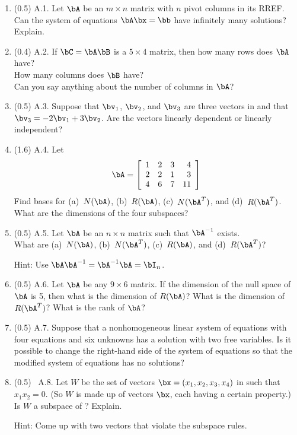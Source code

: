 \documentclass[11pt,titlepage,fleqn]{article}
\begin{document}
\begin{enumerate}
\item (0.5) A.1. Let $\bA$ be an $m \times n$ matrix with $n$ pivot columns in its RREF. \\
Can the system of equations $\bA\bx=\bb$ have infinitely many solutions? Explain.

\item (0.4) A.2. If $\bC = \bA\bB$ is a $5 \times 4$ matrix, then how many rows does $\bA$ have? \\
How many columns does $\bB$ have? \\
Can you say anything about the number of columns in $\bA$?

\item (0.5) A.3. Suppose that $\bv_1$, $\bv_2$, and $\bv_3$ are three vectors in  and that $\bv_3 = -2\bv_1 + 3\bv_2$. Are the vectors linearly dependent or linearly independent?

\item (1.6) A.4. Let
%
\begin{equation*}
\bA =  \left[ \begin{array}{rrrr}
     1  &   2  &   3 & 4 \\
     2  &   2  &   1 & 3 \\
     4  &   6  &   7 & 11 \\
\end{array} \right]
\end{equation*}
%
Find bases for (a)~$N(\bA)$, (b)~$R(\bA)$, (c)~$N(\bA^T)$, and (d)~$R(\bA^T)$. \\
What are the dimensions of the four subspaces?

\item (0.5) A.5. Let $\bA$ be an $n \times n$ matrix such that $\bA^{-1}$ exists. \\
What are (a)~$N(\bA)$, (b)~$N(\bA^T)$, (c)~$R(\bA)$, and (d)~$R(\bA^T)$?

Hint: Use $\bA\bA^{-1} = \bA^{-1}\bA = \bI_n$.

\item (0.5) A.6. Let $\bA$ be any $9 \times 6$ matrix. If the dimension of the null space of $\bA$ is 5, then what is the dimension of $R(\bA)$? What is the dimension of $R(\bA^T)$? What is the rank of $\bA$?

\item (0.5) A.7. Suppose that a nonhomogeneous linear system of equations with four equations and six unknowns has a solution with two free variables. Is it possible to change the right-hand side of the system of equations so that the modified system of equations has no solutions?

\item (0.5) \ptag\ A.8. Let $W$ be the set of vectors $\bx = (x_1,x_2,x_3,x_4)$ in  such that $x_1 x_2 = 0$. (So $W$ is made up of vectors $\bx$, each having a certain property.) Is $W$ a subspace of ? Explain.

Hint: Come up with two vectors that violate the subspace rules.
\end{enumerate}
\end{document}
